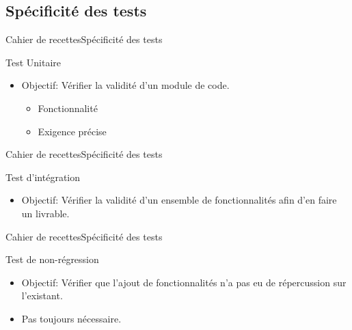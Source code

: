    \subsection{Spécificité des tests}
      \begin{frame}{Cahier de recettes}{Spécificité des tests}
        \begin{block}{Test Unitaire}
          \begin{itemize}
            \item<1-> Objectif: Vérifier la validité d'un module de code.
            \begin{itemize}
              \item<2-> Fonctionnalité
              \item<3-> Exigence précise
            \end{itemize}
          \end{itemize}
        \end{block}
      \end{frame}
      \begin{frame}{Cahier de recettes}{Spécificité des tests}
        \begin{block}{Test d'intégration}
          \begin{itemize}
            \item<1-> Objectif: Vérifier la validité d'un ensemble de fonctionnalités afin d'en faire un livrable.
          \end{itemize}
        \end{block}
      \end{frame}
      \begin{frame}{Cahier de recettes}{Spécificité des tests}
        \begin{block}{Test de non-régression}
          \begin{itemize}
            \item<1-> Objectif: Vérifier que l'ajout de fonctionnalités n'a pas eu de répercussion sur l'existant.
            \item<2-> Pas toujours nécessaire.
          \end{itemize}
        \end{block}
      \end{frame}

